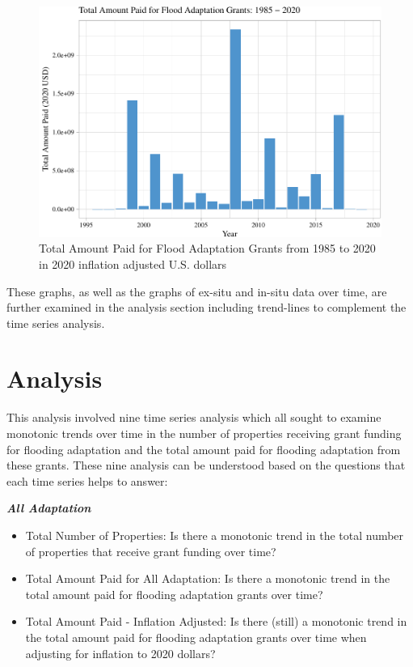 \documentclass[
  12pt,
]{article}
\begin{document}
\begin{figure}
\centering
\includegraphics{finalreport_files/figure-latex/unnamed-chunk-11-1.pdf}
\caption{Total Amount Paid for Flood Adaptation Grants from 1985 to 2020
in 2020 inflation adjusted U.S. dollars}
\end{figure}

These graphs, as well as the graphs of ex-situ and in-situ data over
time, are further examined in the analysis section including trend-lines
to complement the time series analysis.

\newpage

\hypertarget{analysis}{%
\section{Analysis}\label{analysis}}

This analysis involved nine time series analysis which all sought to
examine monotonic trends over time in the number of properties receiving
grant funding for flooding adaptation and the total amount paid for
flooding adaptation from these grants. These nine analysis can be
understood based on the questions that each time series helps to answer:

\textbf{\emph{All Adaptation}}

\begin{itemize}
\item
  Total Number of Properties: Is there a monotonic trend in the total
  number of properties that receive grant funding over time?
\item
  Total Amount Paid for All Adaptation: Is there a monotonic trend in
  the total amount paid for flooding adaptation grants over time?
\item
  Total Amount Paid - Inflation Adjusted: Is there (still) a monotonic
  trend in the total amount paid for flooding adaptation grants over
  time when adjusting for inflation to 2020 dollars?
\end{itemize}
\end{document}
